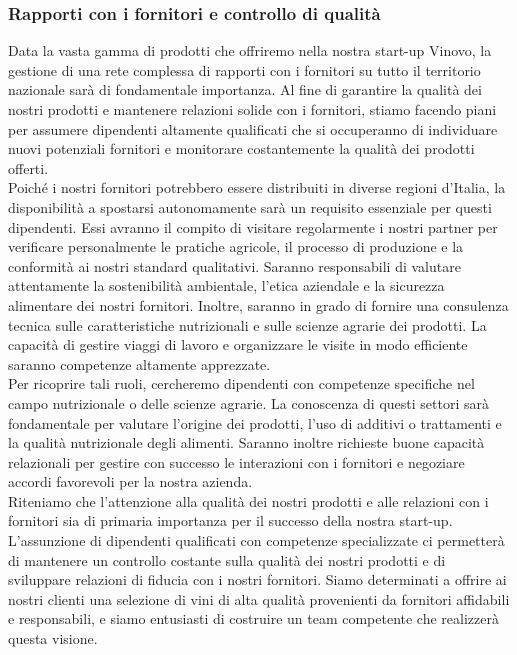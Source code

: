 \documentclass[12pt, a4paper]{article}
\newcommand{\meskip}{\medskip \\}
\begin{document}
\subsubsection{Rapporti con i fornitori e controllo di qualità}
Data la vasta gamma di prodotti che offriremo nella nostra start-up Vinovo, la gestione di una rete complessa di rapporti con i fornitori su tutto il territorio nazionale sarà di fondamentale importanza. Al fine di garantire la qualità dei nostri prodotti e mantenere relazioni solide con i fornitori, stiamo facendo piani per assumere dipendenti altamente qualificati che si occuperanno di individuare nuovi potenziali fornitori e monitorare costantemente la qualità dei prodotti offerti.\meskip
Poiché i nostri fornitori potrebbero essere distribuiti in diverse regioni d'Italia, la disponibilità a spostarsi autonomamente sarà un requisito essenziale per questi dipendenti.
Essi avranno il compito di visitare regolarmente i nostri partner per verificare personalmente le pratiche agricole, il processo di produzione e la conformità ai nostri standard qualitativi. Saranno responsabili di valutare attentamente la sostenibilità ambientale, l'etica aziendale e la sicurezza alimentare dei nostri fornitori. Inoltre, saranno in grado di fornire una consulenza tecnica sulle caratteristiche nutrizionali e sulle scienze agrarie dei prodotti.
La capacità di gestire viaggi di lavoro e organizzare le visite in modo efficiente saranno competenze altamente apprezzate.\meskip
Per ricoprire tali ruoli, cercheremo dipendenti con competenze specifiche nel campo nutrizionale o delle scienze agrarie. La conoscenza di questi settori sarà fondamentale per valutare l'origine dei prodotti, l'uso di additivi o trattamenti e la qualità nutrizionale degli alimenti. Saranno inoltre richieste buone capacità relazionali per gestire con successo le interazioni con i fornitori e negoziare accordi favorevoli per la nostra azienda.\meskip
Riteniamo che l'attenzione alla qualità dei nostri prodotti e alle relazioni con i fornitori sia di primaria importanza per il successo della nostra start-up. L'assunzione di dipendenti qualificati con competenze specializzate ci permetterà di mantenere un controllo costante sulla qualità dei nostri prodotti e di sviluppare relazioni di fiducia con i nostri fornitori. Siamo determinati a offrire ai nostri clienti una selezione di vini di alta qualità provenienti da fornitori affidabili e responsabili, e siamo entusiasti di costruire un team competente che realizzerà questa visione.
\end{document}
